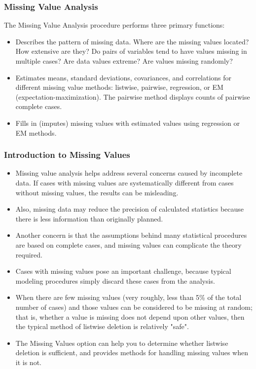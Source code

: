 \documentclass[MASTER.tex]{subfiles}
\begin{document}
\begin{frame}
\frametitle{Missing Value Analysis}
%
The Missing Value Analysis procedure performs three primary functions:

\begin{itemize}
\item Describes the pattern of missing data. Where are the missing values located? How extensive
are they? Do pairs of variables tend to have values missing in multiple cases? Are data
values extreme? Are values missing randomly?
\item Estimates means, standard deviations, covariances, and correlations for different missing
value methods: listwise, pairwise, regression, or EM (expectation-maximization). The
pairwise method displays counts of pairwise complete cases.
\item Fills in (imputes) missing values with estimated values using regression or EM methods.
\end{itemize}

	\end{frame}
	\begin{frame}
	\frametitle{Introduction to Missing Values}	
\begin{itemize}
\item 
Missing value analysis helps address several concerns caused by incomplete data. If cases with
missing values are systematically different from cases without missing values, the results can be
misleading. 
\item Also, missing data may reduce the precision of calculated statistics because there
is less information than originally planned. 
\item Another concern is that the assumptions behind
many statistical procedures are based on complete cases, and missing values can complicate
the theory required.
\end{itemize}
	\end{frame}
	\begin{frame}
\large
	\begin{itemize}
\item Cases with missing values pose an important challenge, because typical modeling procedures simply discard these cases from the analysis. 
\item When there are few missing values (very roughly, less than 5\% of the total number of cases) and those values can be considered to be missing at random; that is, whether a value is missing does not depend upon other values, then the typical method of listwise deletion is relatively "safe". 
\item The Missing Values option can help you to determine whether listwise deletion is sufficient, and provides methods for handling missing values when it is not.

	\end{itemize}
	\end{frame}
\end{document}
